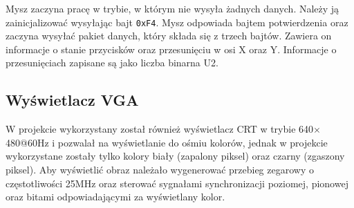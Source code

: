 Mysz zaczyna pracę w trybie, w którym nie wysyła żadnych danych. Należy ją
zainicjalizować wysyłając bajt \texttt{0xF4}. Mysz odpowiada bajtem
potwierdzenia oraz zaczyna wysyłać pakiet danych, który składa się z trzech
bajtów. Zawiera on informacje o stanie przycisków oraz przesunięciu w
osi X oraz Y. Informacje o przesunięciach zapisane są jako liczba binarna U2.

\subsection{Wyświetlacz VGA}
W projekcie wykorzystany został również wyświetlacz CRT w trybie
640$\times$480@60Hz i pozwalał na wyświetlanie do ośmiu kolorów, jednak w
projekcie wykorzystane zostały tylko kolory biały (zapalony piksel) oraz czarny
(zgaszony piksel). Aby wyświetlić obraz należało wygenerować przebieg zegarowy o
częstotliwości 25MHz oraz sterować sygnałami synchronizacji poziomej, pionowej
oraz bitami odpowiadającymi za wyświetlany kolor.

